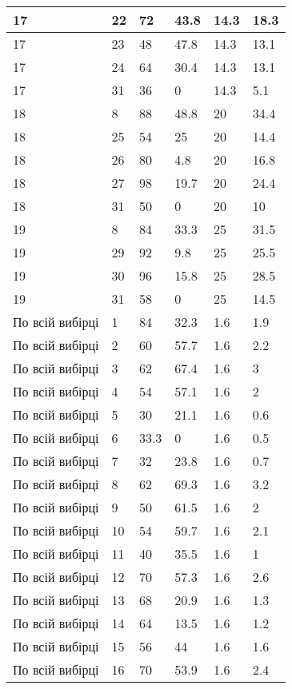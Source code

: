 \begin{longtable}[c]{ | p{2cm} | p{2cm} | p{2cm} | p{2cm} | p{3cm} | p{3cm} | }
	\hline
	17 & 22 & 72 & 43.8 & 14.3 & 18.3 \\
	\hline
	17 & 23 & 48 & 47.8 & 14.3 & 13.1 \\
	\hline
	17 & 24 & 64 & 30.4 & 14.3 & 13.1 \\
	\hline
	17 & 31 & 36 & 0 & 14.3 & 5.1 \\
	\hline
	\hline
	\hline
	18 & 8 & 88 & 48.8 & 20 & 34.4 \\
	\hline
	18 & 25 & 54 & 25 & 20 & 14.4 \\
	\hline
	18 & 26 & 80 & 4.8 & 20 & 16.8 \\
	\hline
	18 & 27 & 98 & 19.7 & 20 & 24.4 \\
	\hline
	18 & 31 & 50 & 0 & 20 & 10 \\
	\hline
	19 & 8 & 84 & 33.3 & 25 & 31.5 \\
	\hline
	19 & 29 & 92 & 9.8 & 25 & 25.5 \\
	\hline
	19 & 30 & 96 & 15.8 & 25 & 28.5 \\
	\hline
	19 & 31 & 58 & 0 & 25 & 14.5 \\
	\hline
	\hline
	\hline
	По всій вибірці & 1 & 84 & 32.3 & 1.6 & 1.9 \\
	\hline
	По всій вибірці & 2 & 60 & 57.7 & 1.6 & 2.2 \\
	\hline
	По всій вибірці & 3 & 62 & 67.4 & 1.6 & 3 \\
	\hline
	По всій вибірці & 4 & 54 & 57.1 & 1.6 & 2 \\
	\hline
	По всій вибірці & 5 & 30 & 21.1 & 1.6 & 0.6 \\
	\hline
	По всій вибірці & 6 & 33.3 & 0 & 1.6 & 0.5 \\
	\hline
	По всій вибірці & 7 & 32 & 23.8 & 1.6 & 0.7 \\
	\hline
	По всій вибірці & 8 & 62 & 69.3 & 1.6 & 3.2 \\
	\hline
	По всій вибірці & 9 & 50 & 61.5 & 1.6 & 2 \\
	\hline
	По всій вибірці & 10 & 54 & 59.7 & 1.6 & 2.1 \\
	\hline
	По всій вибірці & 11 & 40 & 35.5 & 1.6 & 1 \\
	\hline
	По всій вибірці & 12 & 70 & 57.3 & 1.6 & 2.6 \\
	\hline
	По всій вибірці & 13 & 68 & 20.9 & 1.6 & 1.3 \\
	\hline
	По всій вибірці & 14 & 64 & 13.5 & 1.6 & 1.2 \\
	\hline
	По всій вибірці & 15 & 56 & 44 & 1.6 & 1.6 \\
	\hline
	По всій вибірці & 16 & 70 & 53.9 & 1.6 & 2.4 \\

\end{longtable}
